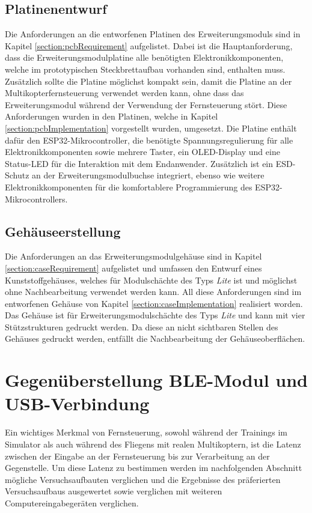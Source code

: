 \subsection{Platinenentwurf}
Die Anforderungen an die entworfenen Platinen des Erweiterungsmoduls sind in Kapitel \ref{section:pcbRequirement} aufgelistet. Dabei ist die Hauptanforderung, dass die Erweiterungsmodulplatine alle benötigten Elektronikkomponenten, welche im prototypischen Steckbrettaufbau vorhanden sind, enthalten muss. Zusätzlich sollte die Platine möglichst kompakt sein, damit die Platine an der Multikopterfernsteuerung verwendet werden kann, ohne dass das Erweiterungsmodul während der Verwendung der Fernsteuerung stört. Diese Anforderungen wurden in den Platinen, welche in Kapitel \ref{section:pcbImplementation} vorgestellt wurden, umgesetzt. Die Platine enthält dafür den ESP32-Mikrocontroller, die benötigte Spannungsregulierung für alle Elektronikkomponenten sowie mehrere Taster, ein \acs{OLED}-Display und eine Status-\acs{LED} für die Interaktion mit dem Endanwender. Zusätzlich ist ein \ac{ESD}-Schutz an der Erweiterungsmodulbuchse integriert, ebenso wie weitere Elektronikkomponenten für die komfortablere Programmierung des ESP32-Mikrocontrollers.

\subsection{Gehäuseerstellung}
Die Anforderungen an das Erweiterungsmodulgehäuse sind in Kapitel \ref{section:caseRequirement} aufgelistet und umfassen den Entwurf eines Kunststoffgehäuses, welches für Modulschächte des Typs \textit{Lite} ist und möglichst ohne Nachbearbeitung verwendet werden kann. All diese Anforderungen sind im entworfenen Gehäuse von Kapitel \ref{section:caseImplementation} realisiert worden. Das Gehäuse ist für Erweiterungsmodulschächte des Typs \textit{Lite} und kann mit vier Stützstrukturen gedruckt werden. Da diese an nicht sichtbaren Stellen des Gehäuses gedruckt werden, entfällt die Nachbearbeitung der Gehäuseoberflächen.

\section{Gegenüberstellung \acs{BLE}-Modul und \acs{USB}-Verbindung}
Ein wichtiges Merkmal von Fernsteuerung, sowohl während der Trainings im Simulator als auch während des Fliegens mit realen Multikoptern, ist die Latenz zwischen der Eingabe an der Fernsteuerung bis zur Verarbeitung an der Gegenstelle. Um diese Latenz zu bestimmen werden im nachfolgenden Abschnitt mögliche Versuchsaufbauten verglichen und  die Ergebnisse des präferierten Versuchsaufbaus ausgewertet sowie verglichen mit weiteren Computereingabegeräten verglichen.

